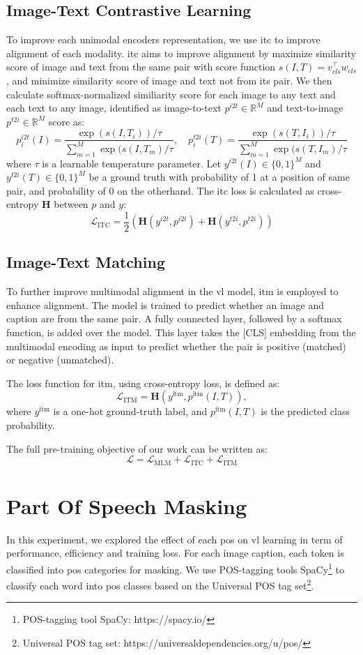 \subsection{Image-Text Contrastive Learning}
To improve each unimodal encoders representation, we use \acrlong{itc} to improve alignment of each modality.
\acrshort{itc} aims to improve alignment by maximize similarity score of image and text from the same pair with score function \(s(I, T) = v_{cls}^\top w_{cls}\), and minimize similarity score of image and text not from its pair.
We then calculate softmax-normalized similiarity score for each image to any text and each text to any image, identified as image-to-text \(p^{i2t} \in \mathbb{R}^{M}\) and text-to-image \(p^{t2i} \in \mathbb{R}^{M}\) score as:
\[
    p^{i2t}_i(I) = \frac{ \exp{(s(I,T_i))/\tau} }{ \sum_{m=1}^{M}\exp{(s(I,T_m)/\tau} }, \quad p^{t2i}_i(T) = \frac{ \exp{(s(T,I_i))/\tau} }{ \sum_{m=1}^{M}\exp{(s(T,I_m)/\tau} }
\]
where \(\tau\) is a learnable temperature parameter. Let \( y^{i2t}(I) \in \{0,1\}^M \) and \( y^{t2i}(T) \in \{0,1\}^M \) be a ground truth with probability of 1 at a position of same pair, and probability of 0 on the otherhand.
The \acrshort{itc} loss is calculated as cross-entropy \(\mathbf{H}\) between \(p\) and \(y\):
\[
    \mathcal{L}_{\text{ITC}} = \frac{1}{2}(\mathbf{H}(y^{i2t},p^{i2t}) + \mathbf{H}(y^{t2i},p^{t2i}))
\]
\subsection{Image-Text Matching}
To further improve multimodal alignment in the \acrshort{vl} model, \acrlong{itm} is employed to enhance alignment. 
The model is trained to predict whether an image and caption are from the same pair. 
A fully connected layer, followed by a softmax function, is added over the model. 
This layer takes the [CLS] embedding from the multimodal encoding as input to predict whether the pair is positive (matched) or negative (unmatched). 

The loss function for \acrshort{itm}, using cross-entropy loss, is defined as:
\[
    \mathcal{L}_{\text{ITM}} = \mathbf{H}(y^{\text{itm}}, p^{\text{itm}}(I, T)),
\]
where \(y^{\text{itm}}\) is a one-hot ground-truth label, and \(p^{\text{itm}}(I, T)\) is the predicted class probability.

The full pre-training objective of our work can be written as:
\[
    \mathcal{L} = \mathcal{L}_{\text{MLM}} + \mathcal{L}_{\text{ITC}} + \mathcal{L}_{\text{ITM}}
\]

\section{Part Of Speech Masking}
In this experiment, we explored the effect of each \acrshort{pos} on \acrshort{vl} learning in term of performance, efficiency and training loss.
For each image caption, each token is classified into \acrshort{pos} categories for masking.
We use POS-tagging tools SpaCy\footnote{POS-tagging tool SpaCy: https://spacy.io/} to classify each word into \acrshort{pos} classes based on the Universal POS tag set\footnote{Universal POS tag set: https://universaldependencies.org/u/pos/}.

